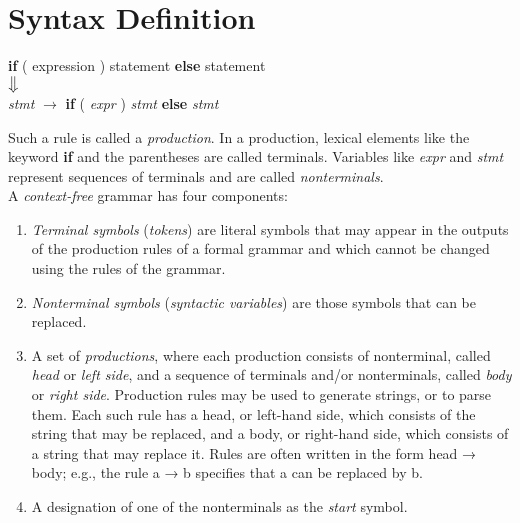 \documentclass[12pt,a4paper,oneside,draft]{report}
\begin{document}
\newpage
\section*{Syntax Definition}
\begin{center}
\textbf{if} ( expression ) statement \textbf {else} statement \\
$\big\Downarrow$ \\
\emph{stmt} $\rightarrow$ \textbf{if} ( \emph{expr} ) \emph{stmt} \textbf{else} \emph{stmt}
\end{center}
\indent\indent Such a rule is called a \emph{production}. In a production, lexical elements like the keyword \textbf{if} and the parentheses are called terminals. Variables like \emph{expr} and \emph{stmt} represent sequences of terminals and are called \emph{nonterminals}. \\

A \emph{context-free} grammar has four components:
\begin{enumerate}
\item \emph{Terminal symbols} (\emph{tokens}) are literal symbols that may appear in the outputs of the production rules of a formal grammar and which cannot be changed using the rules of the grammar.
\item \emph{Nonterminal symbols} (\emph{syntactic variables}) are those symbols that can be replaced.
\item A set of \emph{productions}, where each production consists of nonterminal, called \emph{head} or \emph{left side}, and a sequence of terminals and/or nonterminals, called \emph{body} or \emph{right side}. Production rules may be used to generate strings, or to parse them. Each such rule has a head, or left-hand side, which consists of the string that may be replaced, and a body, or right-hand side, which consists of a string that may replace it. Rules are often written in the form head → body; e.g., the rule a → b specifies that a can be replaced by b.
\item A designation of one of the nonterminals as the \emph{start} symbol.
\end{enumerate}
\end{document}
